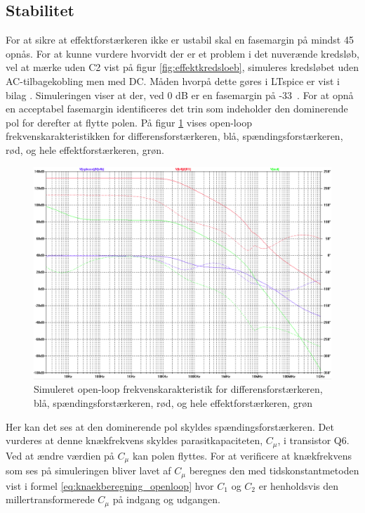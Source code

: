 \subsection{Stabilitet}
\label{effektforstaerker-stabilitet}

For at sikre at effektforstærkeren ikke er ustabil skal en fasemargin på mindst 45\degree~ opnås. For at kunne vurdere hvorvidt der er et problem i det nuverænde kredsløb, vel at mærke uden C2 vist på figur \ref{fig:effektkredsloeb}, simuleres kredsløbet uden AC-tilbagekobling men med DC. Måden hvorpå dette gøres i LTspice er vist i bilag \cite{effektforstaerker-openloop-simulering}%
. Simuleringen viser at der, ved 0 dB er en fasemargin på -33\degree~. For at opnå en acceptabel fasemargin identificeres det trin som indeholder den dominerende pol for derefter at flytte polen. På figur \ref{fig:frek_openloop_ukorigeret} vises open-loop frekvenskarakteristikken for differensforstærkeren, blå, spændingsforstærkeren, rød, og hele effektforstærkeren, grøn. 


\begin{figure}[h]
\centering
\includegraphics[width=\textwidth]{teknisk/effektforstaerker/frek_ukorrigeret_stabilitet.png}
\caption{Simuleret open-loop frekvenskarakteristik for differensforstærkeren, blå, spændingsforstærkeren, rød, og hele effektforstærkeren, grøn}
\label{fig:frek_openloop_ukorigeret}
\end{figure}

Her kan det ses at den dominerende pol skyldes spændingsforstærkeren. Det vurderes at denne knækfrekvens skyldes parasitkapaciteten, $C_\mu$, i transistor Q6. Ved at ændre værdien på $C_\mu$ kan polen flyttes. For at verificere at knækfrekvens som ses på simuleringen bliver lavet af $C_\mu$ beregnes den med tidskonstantmetoden vist i formel \ref{eq:knaekberegning_openloop} \cite{tidskonstantmetoden} %
hvor $C_1$ og $C_2$ er henholdsvis den millertransformerede $C_\mu$ på indgang og udgangen.

